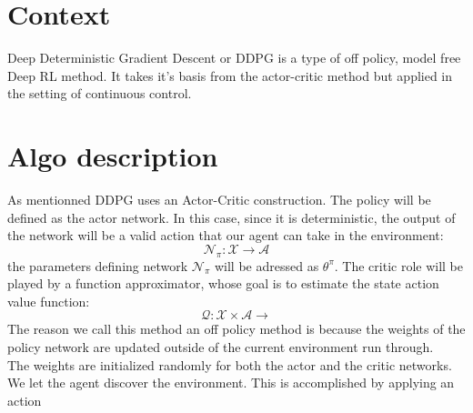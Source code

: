 \documentclass{article}
\begin{document}
    
    \section{Context}
        Deep Deterministic Gradient Descent or DDPG is a type of off policy,
        model free Deep RL method. It takes it's basis from the actor-critic method
        but applied in the setting of continuous control.
    
    \section{Algo description}
        As mentionned DDPG uses an Actor-Critic construction. The
        policy will be defined as the actor network. In this case, since
        it is deterministic, the output of the network will be a valid
        action that our agent can take in the environment: 
        \begin{equation}
            \mathcal{N_{\pi}}: \mathcal{X} \rightarrow \mathcal{A}
        \end{equation}
        the parameters defining network \(\mathcal{N}_{\pi}\) will be adressed
        as \(\theta^{\pi}\). The critic role will be played by a function approximator,
        whose goal is to estimate the state action value function:
        \begin{equation}
            \mathcal{Q}: \mathcal{X}\times\mathcal{A} \rightarrow 
        \end{equation}
        The reason we call this method an off policy method is because the weights of the policy
        network are updated outside of the current environment run through.\\

        The weights are initialized randomly for both the actor and the critic networks. We let the agent
        discover the environment. This is accomplished by applying an action 
\end{document}
